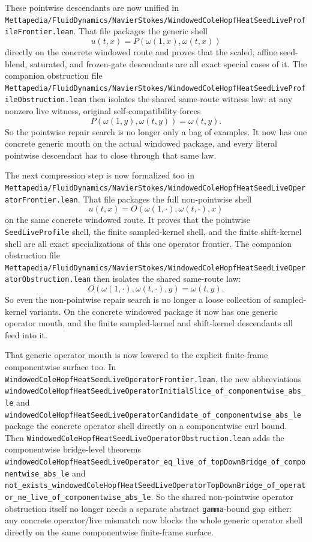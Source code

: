 \documentclass[11pt]{article}
\theoremstyle{remark}
\begin{document}
These pointwise descendants are now unified in
\texttt{Mettapedia/FluidDynamics/NavierStokes/WindowedColeHopfHeatSeedLiveProfileFrontier.lean}.
That file packages the generic shell
\[
  u(t,x)=P(\omega(1,x),\omega(t,x))
\]
directly on the concrete windowed route and proves that the scaled, affine
seed-blend, saturated, and frozen-gate descendants are all exact special cases
of it.  The companion obstruction file
\texttt{Mettapedia/FluidDynamics/NavierStokes/WindowedColeHopfHeatSeedLiveProfileObstruction.lean}
then isolates the shared same-route witness law: at any nonzero live witness,
original self-compatibility forces
\[
  P(\omega(1,y),\omega(t,y))=\omega(t,y).
\]
So the pointwise repair search is no longer only a bag of examples.  It now has
one concrete generic mouth on the actual windowed package, and every literal
pointwise descendant has to close through that same law.

The next compression step is now formalized too in
\texttt{Mettapedia/FluidDynamics/NavierStokes/WindowedColeHopfHeatSeedLiveOperatorFrontier.lean}.
That file packages the full non-pointwise shell
\[
  u(t,x)=O(\omega(1,\cdot),\omega(t,\cdot),x)
\]
on the same concrete windowed route.  It proves that the pointwise
\texttt{SeedLiveProfile} shell, the finite sampled-kernel shell, and the finite
shift-kernel shell are all exact specializations of this one operator frontier.
The companion obstruction file
\texttt{Mettapedia/FluidDynamics/NavierStokes/WindowedColeHopfHeatSeedLiveOperatorObstruction.lean}
then isolates the shared same-route law:
\[
  O(\omega(1,\cdot),\omega(t,\cdot),y)=\omega(t,y).
\]
So even the non-pointwise repair search is no longer a loose collection of
sampled-kernel variants.  On the concrete windowed package it now has one
generic operator mouth, and the finite sampled-kernel and shift-kernel
descendants all feed into it.

That generic operator mouth is now lowered to the explicit finite-frame
componentwise surface too.  In
\texttt{WindowedColeHopfHeatSeedLiveOperatorFrontier.lean}, the new abbreviations
\texttt{windowedColeHopfHeatSeedLiveOperatorInitialSlice\_of\_componentwise\_abs\_le}
and
\texttt{windowedColeHopfHeatSeedLiveOperatorCandidate\_of\_componentwise\_abs\_le}
package the concrete operator shell directly on a componentwise curl bound.
Then \texttt{WindowedColeHopfHeatSeedLiveOperatorObstruction.lean} adds the
componentwise bridge-level theorems
\texttt{windowedColeHopfHeatSeedLiveOperator\_eq\_live\_of\_topDownBridge\_of\_componentwise\_abs\_le}
and
\texttt{not\_exists\_windowedColeHopfHeatSeedLiveOperatorTopDownBridge\_of\_operator\_ne\_live\_of\_componentwise\_abs\_le}.
So the shared non-pointwise operator obstruction itself no longer needs a
separate abstract \texttt{gamma}-bound gap either: any concrete operator/live
mismatch now blocks the whole generic operator shell directly on the same
componentwise finite-frame surface.
\end{document}
